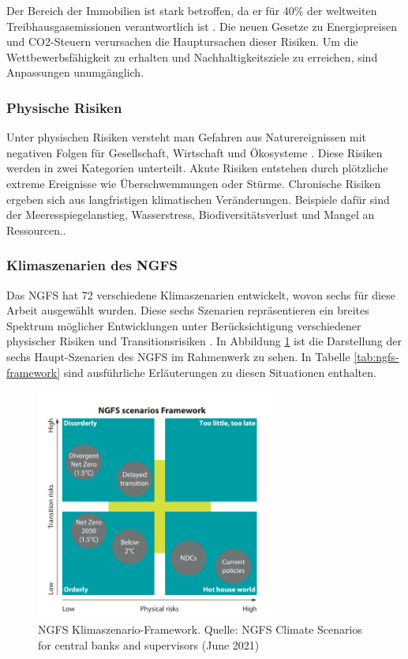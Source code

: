Der Bereich der Immobilien ist stark betroffen, da er für 40\% der weltweiten Treibhausgasemissionen verantwortlich ist \parencite{unepfi2023realestate}. Die neuen Gesetze zu Energiepreisen und CO2-Steuern verursachen die Hauptursachen dieser Risiken. Um die Wettbewerbsfähigkeit zu erhalten und Nachhaltigkeitsziele zu erreichen, sind Anpassungen unumgänglich.
\subsubsection{Physische Risiken}
Unter physischen Risiken versteht man Gefahren aus Naturereignissen mit negativen Folgen für Gesellschaft, Wirtschaft und Ökosysteme \parencite{greenvisionsolutions_transitorische_2024}. Diese Risiken werden in zwei Kategorien unterteilt. Akute Risiken entstehen durch plötzliche extreme Ereignisse wie Überschwemmungen oder Stürme. Chronische Risiken ergeben sich aus langfristigen klimatischen Veränderungen. Beispiele dafür sind der Meeresspiegelanstieg, Wasserstress, Biodiversitätsverlust und Mangel an Ressourcen.\parencite{dnb2019values}.

\subsubsection{Klimaszenarien des NGFS}
Das \ac{NGFS} hat 72 verschiedene Klimaszenarien entwickelt, wovon sechs für diese Arbeit ausgewählt wurden. Diese sechs Szenarien repräsentieren ein breites Spektrum möglicher Entwicklungen unter Berücksichtigung verschiedener physischer Risiken und Transitionsrisiken \parencite{NGFS2021}. In Abbildung \ref{fig:ngfs} ist die Darstellung der sechs Haupt-Szenarien des NGFS im Rahmenwerk zu sehen. In Tabelle \ref{tab:ngfs-framework} sind ausführliche Erläuterungen zu diesen Situationen enthalten.

\begin{figure}[htbp]
    \centering
    \includegraphics[width=0.7\textwidth]{figures/NGFS.png}
    \caption{NGFS Klimaszenario-Framework. Quelle: NGFS Climate Scenarios for central banks and supervisors (June 2021)}
    \label{fig:ngfs}
\end{figure}
\FloatBarrier

